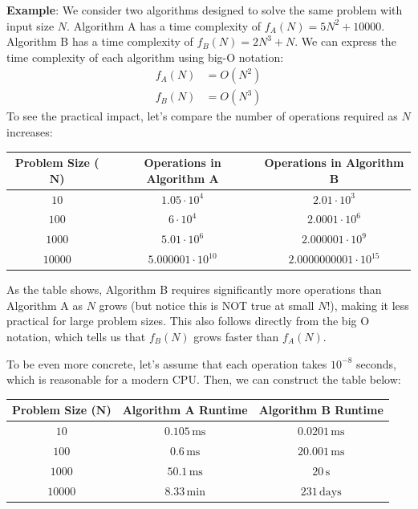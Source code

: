 \begin{exampleBox}
    \textbf{Example}: We consider two algorithms designed to solve the same problem with input size $N$. Algorithm A has a time complexity of $f_A(N) = 5N^2 + 10000$. Algorithm B has a time complexity of $f_B(N) = 2N^3 + N$. We can express the time complexity of each algorithm using big-O notation:
    \begin{align*}
        f_A(N) &= O(N^2) \\
        f_B(N) &= O(N^3)
    \end{align*}
    To see the practical impact, let's compare the number of operations required as $N$ increases:
    \begin{center}
        \begin{tabular}{c|c|c}
            \textbf{Problem Size ($\boldsymbol{N}$)} & \textbf{Operations in Algorithm A} & \textbf{Operations in Algorithm B} \\
            \hline
            $10$ & $1.05\cdot 10^4$ & $2.01\cdot 10^3$ \\
            $100$ & $6\cdot 10^4$ & $2.0001\cdot 10^6$ \\
            $1000$ & $5.01\cdot 10^6$ & $2.000001\cdot 10^9$ \\
            $10000$ & $5.000001\cdot 10^{10}$ & $2.0000000001\cdot 10^{15}$ \\
        \end{tabular}
    \end{center}
    As the table shows, Algorithm B requires significantly more operations than Algorithm A as $N$ grows (but notice this is NOT true at small $N$!), making it less practical for large problem sizes. This also follows directly from the big O notation, which tells us that $f_B(N)$ grows faster than $f_A(N)$.

    To be even more concrete, let's assume that each operation takes $10^{-8}$ seconds, which is reasonable for a modern CPU. Then, we can construct the table below:
    \begin{center}
        \begin{tabular}{c|c|c}
            \textbf{Problem Size ($\boldsymbol{N}$)} & \textbf{Algorithm A Runtime} & \textbf{Algorithm B Runtime} \\
            \hline
            $10$ & $0.105 \,\text{ms}$ & $0.0201 \,\text{ms}$ \\
            $100$ & $0.6 \,\text{ms}$ & $20.001 \,\text{ms}$ \\
            $1000$ & $50.1 \,\text{ms}$ & $20 \,\text{s}$ \\
            $10000$ & $8.33 \,\text{min}$ & $231 \,\text{days}$ \\
        \end{tabular}
    \end{center}
\end{exampleBox}


